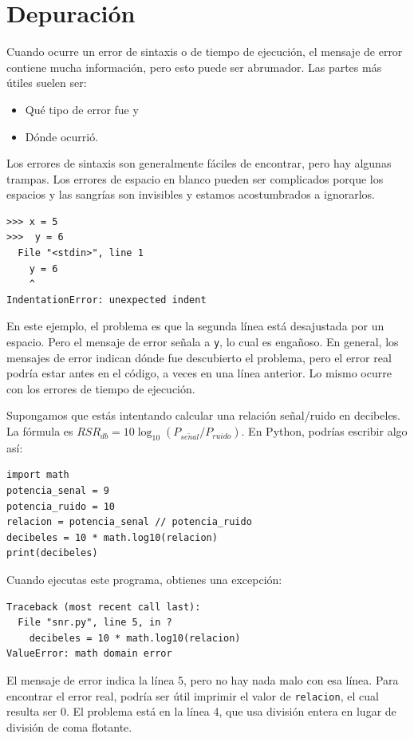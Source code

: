 \documentclass[10pt]{book}
\begin{document}
\section{Depuración}
\label{whitespace}

Cuando ocurre un error de sintaxis o de tiempo de ejecución, el mensaje de error contiene
mucha información, pero esto puede ser abrumador.  Las partes
más útiles suelen ser:

\begin{itemize}

\item Qué tipo de error fue y

\item Dónde ocurrió.

\end{itemize}

Los errores de sintaxis son generalmente fáciles de encontrar, pero hay algunas
trampas.  Los errores de espacio en blanco pueden ser complicados porque los espacios y
las sangrías son invisibles y estamos acostumbrados a ignorarlos.

\begin{verbatim}
>>> x = 5
>>>  y = 6
  File "<stdin>", line 1
    y = 6
    ^
IndentationError: unexpected indent
\end{verbatim}
%
En este ejemplo, el problema es que la segunda línea está desajustada por
un espacio.  Pero el mensaje de error señala a {\tt y}, lo cual es
engañoso.  En general, los mensajes de error indican dónde fue descubierto
el problema, pero el error real podría estar antes en el código,
a veces en una línea anterior. Lo mismo ocurre con los errores de tiempo de ejecución. 

Supongamos que estás intentando
calcular una relación señal/ruido en decibeles.  La fórmula
es $RSR_{db} = 10 \log_{10} (P_{se\tilde{n}al} / P_{ruido})$.  En Python,
podrías escribir algo así:

\begin{verbatim}
import math
potencia_senal = 9
potencia_ruido = 10
relacion = potencia_senal // potencia_ruido
decibeles = 10 * math.log10(relacion)
print(decibeles)
\end{verbatim}
%
Cuando ejecutas este programa, obtienes una excepción:
%

\begin{verbatim}
Traceback (most recent call last):
  File "snr.py", line 5, in ?
    decibeles = 10 * math.log10(relacion)
ValueError: math domain error
\end{verbatim}
%
El mensaje de error indica la línea 5, pero no hay nada
malo con esa línea.  Para encontrar el error real, podría ser
útil imprimir el valor de {\tt relacion}, el cual resulta
ser 0.  El problema está en la línea 4, que usa división entera
en lugar de división de coma flotante.
\end{document}
